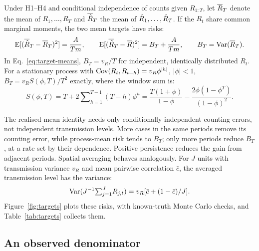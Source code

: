 \begin{corollary}
\label{cor:targets}
Under H1--H4 and conditional independence of counts given $R_{1:T}$, let $\overline{R}_T$ denote the mean of $R_1,\dots,R_T$ and $\overline{\hat R}_T$ the mean of $\hat R_1,\dots,\hat R_T$. If the $R_t$ share common marginal moments, the two mean targets have risks:
\begin{equation}
  \operatorname{E}[(\overline{\hat R}_T-\overline{R}_T)^2]=\frac{A}{Tm},\qquad
  \operatorname{E}[(\overline{\hat R}_T-\overline{R})^2]=B_T+\frac{A}{Tm},
  \qquad B_T=\operatorname{Var}(\overline{R}_T).
  \label{eq:target-means}
\end{equation}
In Eq.~\eqref{eq:target-means}, $B_T=v_R/T$ for independent, identically distributed $R_t$. For a stationary process with $\operatorname{Cov}(R_t,R_{t+h})=v_R\phi^{|h|}$, $|\phi|<1$, $B_T=v_RS(\phi,T)/T^2$ exactly, where the window sum is:
\begin{equation}
  S(\phi,T)=T+2\sum\nolimits_{h=1}^{T-1}(T-h)\phi^h
  =\frac{T(1+\phi)}{1-\phi}-\frac{2\phi(1-\phi^T)}{(1-\phi)^2}.
  \label{eq:ar-sum}
\end{equation}
\end{corollary}

The realised-mean identity needs only conditionally independent counting errors, not independent transmission levels. More cases in the same periods remove its counting error, while process-mean risk tends to $B_T$; only more periods reduce $B_T$, at a rate set by their dependence. Positive persistence reduces the gain from adjacent periods. Spatial averaging behaves analogously. For $J$ units with transmission variance $v_R$ and mean pairwise correlation $\bar c$, the averaged transmission level has the variance:
\begin{equation}
  \operatorname{Var}(J^{-1}{\textstyle\sum_{j=1}^J}R_{j,t})=v_R[\bar c+(1-\bar c)/J].
  \label{eq:pooling}
\end{equation}
Figure~\ref{fig:targets} plots these risks, with known-truth Monte Carlo checks, and Table~\ref{tab:targets} collects them.

\subsection{An observed denominator}
\label{sec:model-observed}

